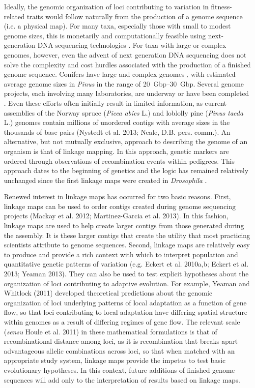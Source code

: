 \documentclass[11pt]{article}
\begin{document}
Ideally, the genomic organization of loci contributing to variation in fitness-related traits would follow 
naturally from the production of a genome sequence (i.e. a physical map). For many taxa, especially those with 
small to modest genome sizes, this is monetarily and computationally feasible using next-generation DNA sequencing 
technologies \citep{Koboldt:2013}. For taxa with large or complex genomes, however, even the advent of next generation DNA 
sequencing does not solve the complexity and cost hurdles associated with the production of a finished genome sequence. Conifers have large and 
complex genomes \citep{Murray:1998, Ahuja:2005}, with estimated average genome sizes in \textit{Pinus} in the 
range of \SIrange{20}{30}{Gbp}. Several genome projects, each involving many laboratories, are underway or have been 
completed \citep{Mackay:2012}. Even these efforts often initially result in limited information, 
as current assemblies of the Norway spruce (\textit{Picea abies} L.) and loblolly pine (\textit{Pinus taeda} L.) genomes 
contain millions of unordered contigs with average sizes in the thousands of base pairs (Nystedt et al. 2013; 
Neale, D.B. pers. comm.). An alternative, but not mutually exclusive, approach to describing the genome of an organism 
is that of linkage mapping. In this approach, genetic markers are ordered through observations of recombination events 
within pedigrees. This approach dates to the beginning of genetics and the logic has remained relatively unchanged 
since the first linkage maps were created in \textit{Drosophila} \citep{Sturtevant:1913}.

Renewed interest in linkage maps has occurred for two basic reasons. First, linkage maps can be used to order contigs 
created during genome sequencing projects (Mackay et al. 2012; Martinez-Garcia et al. 2013). In this fashion, linkage 
maps are used to help create larger contigs from those generated during the assembly. It is these larger contigs that 
create the utility that most practicing scientists attribute to genome sequences. Second, linkage maps are relatively 
easy to produce and provide a rich context with which to interpret population and quantitative genetic patterns of variation 
(e.g. Eckert et al. 2010a,b; Eckert et al. 2013; Yeaman 2013). They can also be used to test explicit hypotheses about 
the organization of loci contributing to adaptive evolution. For example, Yeaman and Whitlock (2011) developed theoretical 
predictions about the genomic organization of loci underlying patterns of local adaptation as a function of gene flow, 
so that loci contributing to local adaptation have differing spatial structure within genomes as a result of differing 
regimes of gene flow. The relevant scale (\textit{sensu} Houle et al. 2011) in these mathematical formulations is that 
of recombinational distance among loci, as it is recombination that breaks apart advantageous allelic combinations across 
loci, so that when matched with an appropriate study system, linkage maps provide the impetus to test basic evolutionary 
hypotheses. In this context, future additions of finished genome sequences will add only to the interpretation of 
results based on linkage maps.
\end{document}
